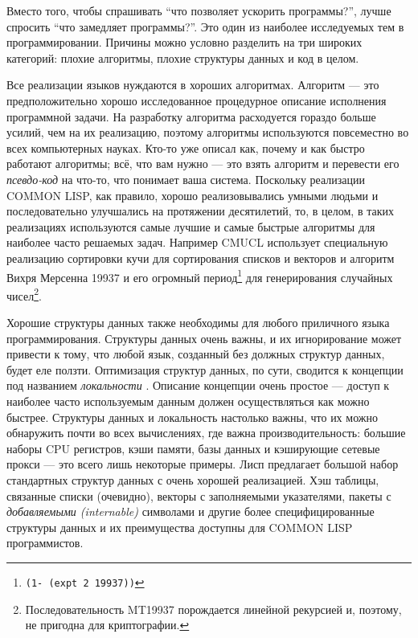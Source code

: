 Вместо того, чтобы спрашивать ``что позволяет ускорить программы?'', лучше спросить ``что замедляет программы?''. Это один из наиболее исследуемых тем в программировании. Причины можно условно разделить на три широких категорий: плохие алгоритмы, плохие структуры данных и код в целом.

Все реализации языков нуждаются в хороших алгоритмах. Алгоритм --- это предположительно хорошо исследованное процедурное описание исполнения программной задачи. На разработку алгоритма расходуется гораздо больше усилий, чем на их реализацию, поэтому алгоритмы используются повсеместно во всех компьютерных науках. Кто-то уже описал как, почему и как быстро работают алгоритмы; всё, что вам нужно --- это взять алгоритм и перевести его \emph{псевдо-код} на что-то, что понимает ваша система. Поскольку реализации COMMON LISP, как правило, хорошо реализовывались умными людьми и последовательно улучшались на протяжении десятилетий, то, в целом, в таких реализациях используются самые лучшие и самые быстрые алгоритмы для наиболее часто решаемых задач. Например CMUCL использует специальную реализацию сортировки кучи для сортирования списков и векторов и алгоритм Вихря Мерсенна 19937 и его огромный период\footnote{\texttt{(1- (expt 2 19937))}} для генерирования случайных чисел\footnote{Последовательность MT19937 порождается линейной рекурсией и, поэтому, не пригодна для криптографии.}.

Хорошие структуры данных также необходимы для любого приличного языка программирования. Структуры данных очень важны, и их игнорирование может привести к тому, что любой язык, созданный без должных структур данных, будет еле ползти. Оптимизация структур данных, по сути, сводится к концепции под названием \emph{локальности }. Описание концепции очень простое --- доступ к наиболее часто используемым данным должен осуществляться как можно быстрее. Структуры данных и локальность настолько важны, что их можно обнаружить почти во всех вычислениях, где важна производительность: большие наборы CPU регистров, кэши памяти, базы данных и кэширующие сетевые прокси --- это всего лишь некоторые примеры. Лисп предлагает большой набор стандартных структур данных с очень хорошей реализацией. Хэш таблицы, связанные списки (очевидно), векторы с заполняемыми указателями, пакеты с \emph{добавляемыми (internable)} символами и другие более специфицированные структуры данных и их преимущества доступны для COMMON LISP программистов.

